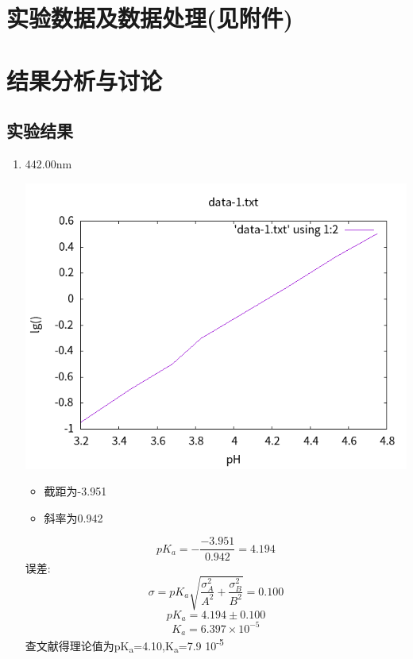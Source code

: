 \documentclass[11pt]{report}
\begin{document}
\chapter{实验数据及数据处理(见附件)}
\label{sec:org5361b03}
\chapter{结果分析与讨论}
\label{sec:org190c590}
\section{实验结果}
\label{sec:org3737795}

\begin{enumerate}
\item 442.00nm
\label{sec:orge6eae3c}
\begin{center}
\includegraphics[width=.9\linewidth]{../img/data-1.txt.png}
\end{center}
\begin{itemize}
\item 截距为-3.951
\item 斜率为0.942
\end{itemize}
\[
pK_{a}=-\frac{-3.951}{0.942}=4.194
\]
误差:
\[
\sigma=pK_{a}\sqrt{\frac{\sigma_{A}^{2}}{A^{2}}+\frac{\sigma_{B}^{2}}{B^{2}}}=0.100
\]
\[
pK_{a}=4.194\pm 0.100
\]
\[
K_{a}=6.397\times 10^{-5}
\]
查文献得理论值为pK\textsubscript{a}=4.10,K\textsubscript{a}=7.9\texttimes{} 10\textsuperscript{-5}


\end{enumerate}
\end{document}
